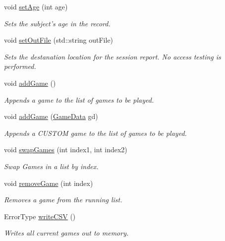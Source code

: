 \begin{DoxyCompactItemize}
void \hyperlink{class_trial_data_acd2c2aedea1718872165ce0bf0df6029}{set\+Age} (int age)
\begin{DoxyCompactList}\small\item\em Sets the subject's age in the record. \end{DoxyCompactList}\item 
void \hyperlink{class_trial_data_afdedfaa564bfe3ca1529614c32acef37}{set\+Out\+File} (std\+::string out\+File)
\begin{DoxyCompactList}\small\item\em Sets the destanation location for the session report. No access testing is performed. \end{DoxyCompactList}\item 
\hypertarget{class_trial_data_ac0a8256a5f04818711c72ff88223839c}{void \hyperlink{class_trial_data_ac0a8256a5f04818711c72ff88223839c}{add\+Game} ()}\label{class_trial_data_ac0a8256a5f04818711c72ff88223839c}

\begin{DoxyCompactList}\small\item\em Appends a game to the list of games to be played. \end{DoxyCompactList}\item 
void \hyperlink{class_trial_data_af3a0f221160d45fd6d28168235ed3d5a}{add\+Game} (\hyperlink{class_game_data}{Game\+Data} gd)
\begin{DoxyCompactList}\small\item\em Appends a C\+U\+S\+T\+O\+M game to the list of games to be played. \end{DoxyCompactList}\item 
void \hyperlink{class_trial_data_a2af0b8b20496f6daf919e52e103da7de}{swap\+Games} (int index1, int index2)
\begin{DoxyCompactList}\small\item\em Swap Games in a list by index. \end{DoxyCompactList}\item 
void \hyperlink{class_trial_data_a0c941bb4edc8d98ed0883650a1d7f502}{remove\+Game} (int index)
\begin{DoxyCompactList}\small\item\em Removes a game from the running list. \end{DoxyCompactList}\item 
Error\+Type \hyperlink{class_trial_data_aa18ad64f9b9b6b980fec9ab3e1455559}{write\+C\+S\+V} ()
\begin{DoxyCompactList}\small\item\em Writes all current games out to memory. \end{DoxyCompactList}\end{DoxyCompactItemize}
